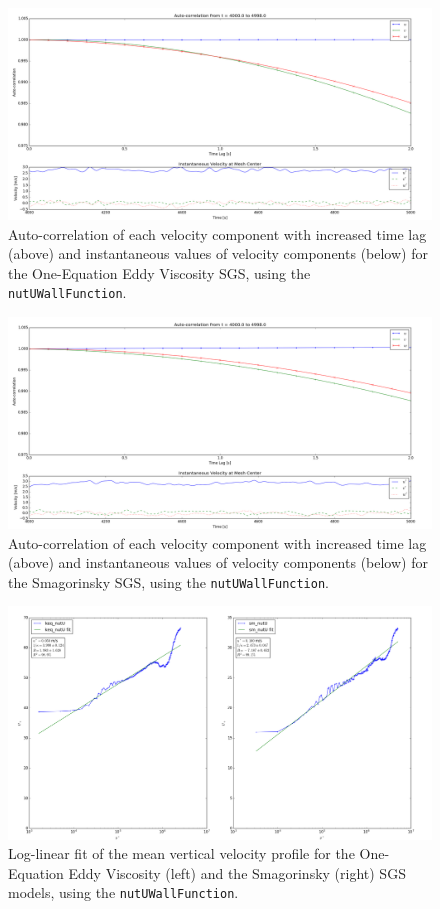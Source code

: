 \documentclass[12pt]{article}
\begin{document}
\begin{figure}[H]
\centering
\includegraphics[scale=0.35]{nutU/keq_stability.png}
\caption{Auto-correlation of each velocity component with increased time lag (above) and instantaneous values of velocity components (below) for the One-Equation Eddy Viscosity SGS, using the \texttt{nutUWallFunction}.}
\label{nutU_keq_stab}
\end{figure}
  
\begin{figure}[H]
\centering
\includegraphics[scale=0.35]{nutU/sm_stability.png}
\caption{Auto-correlation of each velocity component with increased time lag (above) and instantaneous values of velocity components (below) for the Smagorinsky SGS, using the \texttt{nutUWallFunction}.}
\label{nutU_sm_stab}
\end{figure}

\begin{figure}[H]
\centering
\includegraphics[scale=0.35]{nutU/keq_sm_log.png}
\caption{Log-linear fit of the mean vertical velocity profile for the One-Equation Eddy Viscosity (left) and the Smagorinsky (right) SGS models, using the \texttt{nutUWallFunction}.}
\label{nutU_keq_sm_log}
\end{figure}

\pagebreak

\end{document}
